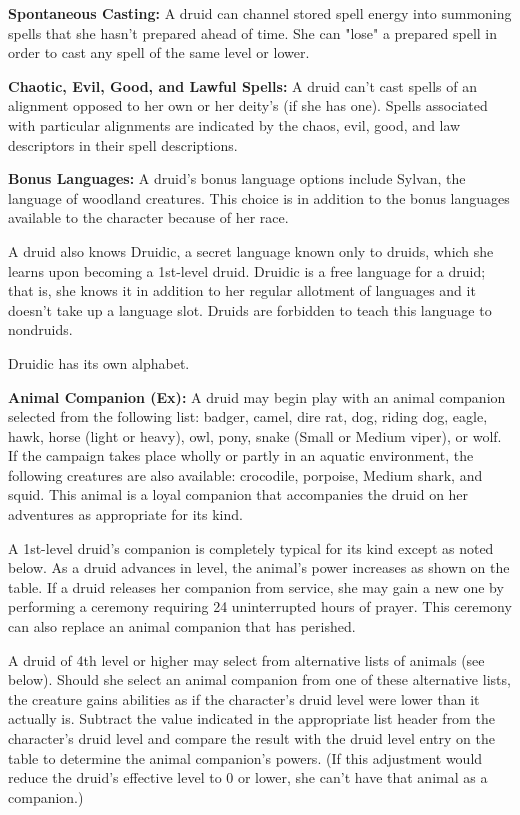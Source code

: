 \textbf{Spontaneous Casting:} A druid can channel stored spell energy into summoning 
spells that she hasn't prepared ahead of time. She can "lose" a prepared spell 
in order to cast any  spell of the same level or lower.

\textbf{Chaotic, Evil, Good, and Lawful Spells:} A druid can't cast spells of an alignment 
opposed to her own or her deity's (if she has one). Spells associated with particular 
alignments are indicated by the chaos, evil, good, and law descriptors in their 
spell descriptions.

\textbf{Bonus Languages:} A druid's bonus language options include Sylvan, the 
language of woodland creatures. This choice is in addition to the bonus languages 
available to the character because of her race.

A druid also knows Druidic, a secret language known only to druids, which she learns 
upon becoming a 1st-level druid. Druidic is a free language for a druid; that is, 
she knows it in addition to her regular allotment of languages and it doesn't take 
up a language slot. Druids are forbidden to teach this language to nondruids.

Druidic has its own alphabet.

\textbf{Animal Companion (Ex):} A druid may begin play with an animal companion 
selected from the following list: badger, camel, dire rat, dog, riding dog, eagle, 
hawk, horse (light or heavy), owl, pony, snake (Small or Medium viper), or wolf. 
If the campaign takes place wholly or partly in an aquatic environment, the following 
creatures are also available: crocodile, porpoise, Medium shark, and squid. This 
animal is a loyal companion that accompanies the druid on her adventures as appropriate 
for its kind.

A 1st-level druid's companion is completely typical for its kind except as noted 
below. As a druid advances in level, the animal's power increases as shown on the 
table. If a druid releases her companion from service, she may gain a new one by 
performing a ceremony requiring 24 uninterrupted hours of prayer. This ceremony 
can also replace an animal companion that has perished.

A druid of 4th level or higher may select from alternative lists of animals (see 
below). Should she select an animal companion from one of these alternative lists, 
the creature gains abilities as if the character's druid level were lower than 
it actually is. Subtract the value indicated in the appropriate list header from 
the character's druid level and compare the result with the druid level entry on 
the table to determine the animal companion's powers. (If this adjustment would 
reduce the druid's effective level to 0 or lower, she can't have that animal as 
a companion.) 

